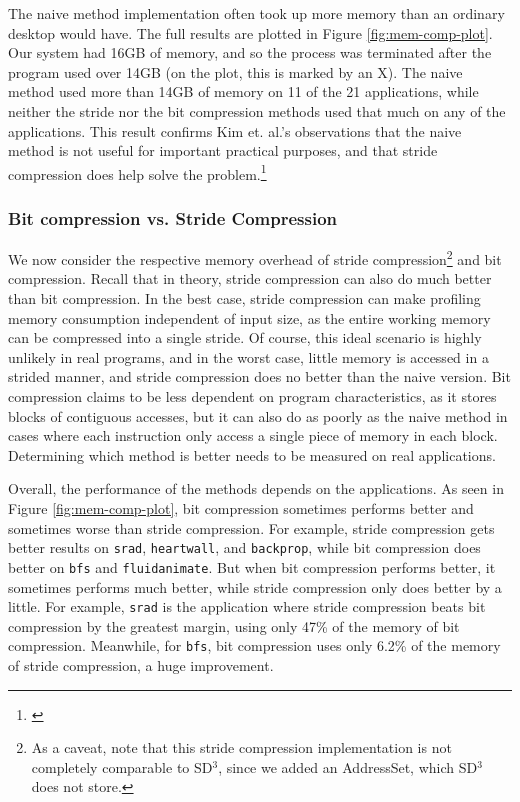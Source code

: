 \documentclass[12pt,twoside]{reedthesis}
\begin{document}
		The naive method implementation often took up more memory than an ordinary desktop would have. The full results are plotted in Figure \ref{fig:mem-comp-plot}. Our system had 16GB of memory, and so the process was terminated after the program used over 14GB (on the plot, this is marked by an X). The naive method used more than 14GB of memory on 11 of the 21 applications, while neither the stride nor the bit compression methods used that much on any of the applications. This result confirms Kim et. al.'s observations that the naive method is not useful for important practical purposes, and that stride compression does help solve the problem.\footnote{\cite{Kim:2010}}
		
		
		
		\subsubsection{Bit compression vs. Stride Compression}
		
		We now consider the respective memory overhead of stride compression\footnote{As a caveat, note that this stride compression implementation is not completely comparable to SD$^3$, since we added an AddressSet, which SD$^3$ does not store.} and bit compression. 
		Recall that in theory, stride compression can also do much better than bit compression. In the best case, stride compression can make profiling memory consumption independent of input size, as the entire working memory can be compressed into a single stride. Of course, this ideal scenario is highly unlikely in real programs, and in the worst case, little memory is accessed in a strided manner, and stride compression does no better than the naive version. Bit compression claims to be less dependent on program characteristics, as it stores blocks of contiguous accesses, but it can also do as poorly as the naive method in cases where each instruction only access a single piece of memory in each block. Determining which method is better needs to be measured on real applications. 
		
		Overall, the performance of the methods depends on the applications. As seen in Figure \ref{fig:mem-comp-plot}, bit compression sometimes performs better and sometimes worse than stride compression. For example, stride compression gets better results on \texttt{srad}, \texttt{heartwall}, and \texttt{backprop}, while bit compression does better on \texttt{bfs} and \texttt{fluidanimate}. But when bit compression performs better, it sometimes performs much better, while stride compression only does better by a little. For example, \texttt{srad} is the application where stride compression beats bit compression by the greatest margin, using only 47\% of the memory of bit compression. Meanwhile, for \texttt{bfs}, bit compression uses only 6.2\% of the memory of stride compression, a huge improvement.
\end{document}
